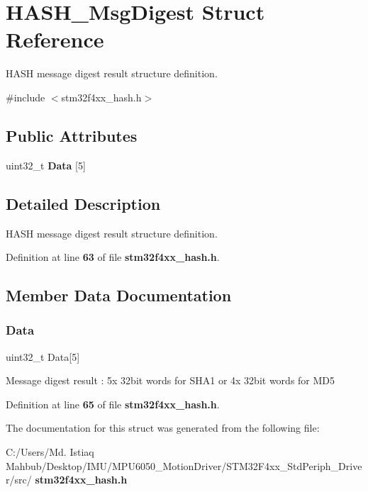 \section{H\+A\+S\+H\+\_\+\+Msg\+Digest Struct Reference}
\label{structHASH__MsgDigest}


H\+A\+SH message digest result structure definition.  




{\ttfamily \#include $<$stm32f4xx\+\_\+hash.\+h$>$}

\subsection*{Public Attributes}
\begin{DoxyCompactItemize}
\item 
uint32\+\_\+t \textbf{ Data} [5]
\end{DoxyCompactItemize}


\subsection{Detailed Description}
H\+A\+SH message digest result structure definition. 

Definition at line \textbf{ 63} of file \textbf{ stm32f4xx\+\_\+hash.\+h}.



\subsection{Member Data Documentation}
\mbox{\label{structHASH__MsgDigest_a22779bbc5e6746dbf4e4b065dc08f0a5}} 
\subsubsection{Data}
{\footnotesize\ttfamily uint32\+\_\+t Data[5]}

Message digest result \+: 5x 32bit words for S\+H\+A1 or 4x 32bit words for M\+D5 

Definition at line \textbf{ 65} of file \textbf{ stm32f4xx\+\_\+hash.\+h}.



The documentation for this struct was generated from the following file\+:\begin{DoxyCompactItemize}
\item 
C\+:/\+Users/\+Md. Istiaq Mahbub/\+Desktop/\+I\+M\+U/\+M\+P\+U6050\+\_\+\+Motion\+Driver/\+S\+T\+M32\+F4xx\+\_\+\+Std\+Periph\+\_\+\+Driver/src/\textbf{ stm32f4xx\+\_\+hash.\+h}\end{DoxyCompactItemize}
